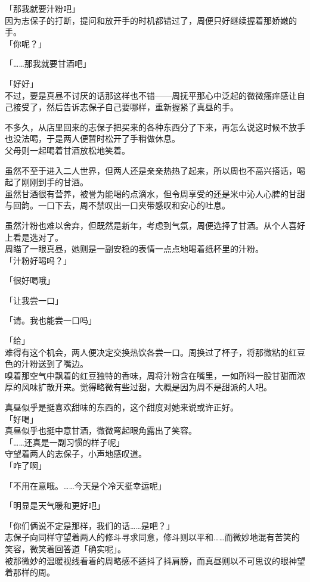 「那我就要汁粉吧」\\

因为志保子的打断，提问和放开手的时机都错过了，周便只好继续握着那娇嫩的手。\\

「你呢？」

「……那我就要甘酒吧」

「好好」\\

不过，要是真昼不讨厌的话那这样也不错——周抚平那心中泛起的微微瘙痒感让自己接受了，然后告诉志保子自己要哪样，重新握紧了真昼的手。\\

\vspace{2\baselineskip}

不多久，从店里回来的志保子把买来的各种东西分了下来，再怎么说这时候不放手也没法喝，于是两人便暂时松开了手稍做休息。\\

父母则一起喝着甘酒放松地笑着。

虽然不至于进入二人世界，但两人还是亲亲热热了起来，所以周也不高兴搭话，喝起了刚刚到手的甘酒。\\

虽然甘酒很有营养，被誉为能喝的点滴水，但令周享受的还是米中沁人心脾的甘甜与回韵。一口下去，周不禁叹出一口夹带感叹和安心的吐息。

虽然汁粉也难以舍弃，但既然是新年，考虑到气氛，周便选择了甘酒。从个人喜好上看是选对了。\\

周瞄了一眼真昼，她则是一副安稳的表情一点点地喝着纸杯里的汁粉。\\

「汁粉好喝吗？」

「很好喝哦」

「让我尝一口」

「请。我也能尝一口吗」

「给」\\

难得有这个机会，两人便决定交换热饮各尝一口。周换过了杯子，将那微粘的红豆色的汁粉送到了嘴边。\\

嗅着那空气中飘着的红豆独特的香味，周将汁粉含在嘴里，一如所料一股甘甜而浓厚的风味扩散开来。觉得略微有些过甜，大概是因为周不是甜派的人吧。

真昼似乎是挺喜欢甜味的东西的，这个甜度对她来说或许正好。\\

「好喝」\\

真昼似乎也挺中意甘酒，微微弯起眼角露出了笑容。\\

「……还真是一副习惯的样子呢」\\

守望着两人的志保子，小声地感叹道。\\

「咋了啊」

「不用在意哦。……今天是个冷天挺幸运呢」

「明显是天气暖和更好吧」

「你们俩说不定是那样，我们的话……是吧？」\\

志保子向同样守望着两人的修斗寻求同意，修斗则以平和……而微妙地混有苦笑的笑容，微笑着回答道「确实呢」。\\

被那微妙的温暖视线看着的周略感不适抖了抖肩膀，而真昼则以不可思议的眼神望着那样的周。
